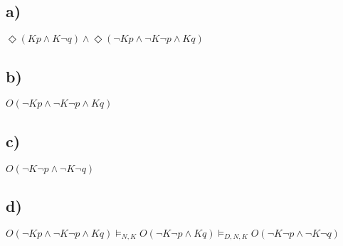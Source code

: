 \documentclass[a4paper]{article}
\begin{document}
\subsection{a)}
$
\Diamond(K p \land K \lnot q) \land \Diamond(\lnot K p \land \lnot K \lnot p \land K q)
$
\subsection{b)}
$
O(\lnot K p \land \lnot K \lnot p \land K q)
$
\subsection{c)}
$
O(\lnot K \lnot p \land \lnot K \lnot q)
$
\subsection{d)}
$
O(\lnot K p \land \lnot K \lnot p \land K q)
\models_{N, K} O(\lnot K \lnot p \land K q)
\models_{D, N, K} O(\lnot K \lnot p \land \lnot K \lnot q)
$
\end{document}
